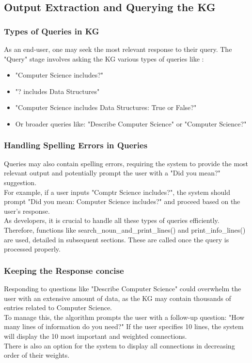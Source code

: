 \documentclass[conference]{IEEEtran}
\begin{document}
\subsection{\textbf{Output Extraction and Querying the KG}}

\subsubsection{Types of Queries in KG}

As an end-user, one may seek the most relevant response to their query. The "Query" stage involves asking the KG various types of queries like :
\begin{itemize}
    \item "Computer Science includes?"
    \item "? includes Data Structures"
    \item "Computer Science includes Data Structures: True or False?"
    \item Or broader queries like: "Describe Computer Science" or "Computer Science?"
\end{itemize}

\subsubsection{Handling Spelling Errors in Queries}
Queries may also contain spelling errors, requiring the system to provide the most relevant output and potentially prompt the user with a "Did you mean?" suggestion.
\\
For example, if a user inputs "Comptr Science includes?", the system should prompt
"Did you mean: Computer Science includes?" 
and proceed based on the user's response.
\\

As developers, it is crucial to handle all these types of queries efficiently. Therefore, functions like search\_noun\_and\_print\_lines() and print\_info\_lines() are used, detailed in subsequent sections.
These are called once the query is processed properly.
\\

\subsubsection{Keeping the Response concise}

Responding to questions like "Describe Computer Science" could overwhelm the user with an extensive amount of data, as the KG may contain thousands of entries related to Computer Science. \\
To manage this, the algorithm prompts the user with a follow-up question: "How many lines of information do you need?" If the user specifies 10 lines, the system will display the 10 most important and weighted connections. 
\\
There is also an option for the system to display all connections in decreasing order of their weights.
\end{document}

